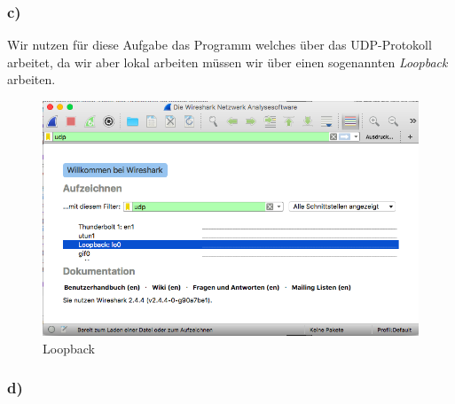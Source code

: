 \subsubsection{c)}
Wir nutzen für diese Aufgabe das Programm welches über das UDP-Protokoll arbeitet, da wir aber lokal arbeiten müssen wir über einen sogenannten \textit{Loopback} arbeiten.
\begin{figure}[H]
	\centering
	\includegraphics[width=0.7 \linewidth]{images/w05}
	\caption{Loopback} \label{ordner}
\end{figure} 

\subsubsection{d)}

